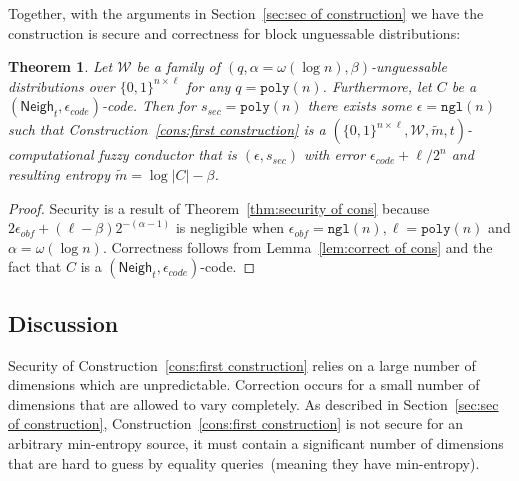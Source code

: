 \documentclass[11pt]{article}
\newcommand{\secref}[1]{\mbox{Section~\ref{#1}}}
\newcommand{\thref}[1]{\mbox{Theorem~\ref{#1}}}
\newcommand{\lemref}[1]{\mbox{Lemma~\ref{#1}}}
\newcommand{\consref}[1]{\mbox{Construction~\ref{#1}}}
\newcommand{\class}[1]{{\ensuremath{\mathsf{#1}}}}
\newcommand{\zo}{\ensuremath{\{0, 1\}}}
\newcommand{\neigh}{\ensuremath{\class{Neigh}}\xspace}
\newcommand{\poly}{\ensuremath{\mathtt{poly}}\xspace}
\newcommand{\ngl}{\ensuremath{\mathtt{ngl}}\xspace}
\newtheorem{theorem}{Theorem}[section]
\newcommand{\authnote}[2]{{\textcolor{red}{\textsf{#1 notes: }\textcolor{blue}{ #2}}\marginpar{\textcolor{red}{\textbf{!!!!!}}}}}
\newcommand{\authnote}[2]{}
\newcommand{\bnote}[1]{{\authnote{Ben}{#1}}}
\begin{document}
Together, with the arguments in \secref{sec:sec of construction} we have the construction is secure and correctness for block unguessable distributions:
\begin{theorem}
Let $\mathcal{W}$ be a family of $(q,\alpha= \omega(\log n),  \beta)$-unguessable distributions over $\zo^{n\times \ell}$ for any $q = \poly(n)$.  Furthermore, let $C$ be a $(\neigh_t, \epsilon_{code})$-code.  Then for $s_{sec} = \poly(n)$ there exists some $\epsilon=\ngl(n)$ such that \consref{cons:first construction} is a $(\zo^{n\times \ell}, \mathcal{W}, \tilde{m}, t)$-computational fuzzy conductor that is $(\epsilon, s_{sec})$ with error $\epsilon_{code} + \ell/2^n$ and resulting entropy $\tilde{m} =\log |C| - \beta$.
\end{theorem}
\begin{proof}
Security is a result of \thref{thm:security of cons} because $2\epsilon_{obf} + (\ell-\beta)2^{-(\alpha-1)}$ is negligible when $\epsilon_{obf} = \ngl(n), \ell = \poly(n)$ and $\alpha =\omega(\log n)$.  Correctness follows from \lemref{lem:correct of cons} and the fact that $C$ is a $(\neigh_t, \epsilon_{code})$-code.
\end{proof}


%
%


\subsection{Discussion}
\label{sec:discussion}
Security of \consref{cons:first construction} relies on a large number of dimensions which are unpredictable.  Correction occurs for a small number of dimensions that are allowed to vary completely.  As described in \secref{sec:sec of construction}, \consref{cons:first construction} is not secure for an arbitrary min-entropy source, it must contain a significant number of dimensions that are hard to guess by equality queries~(meaning they have min-entropy).
\end{document}
